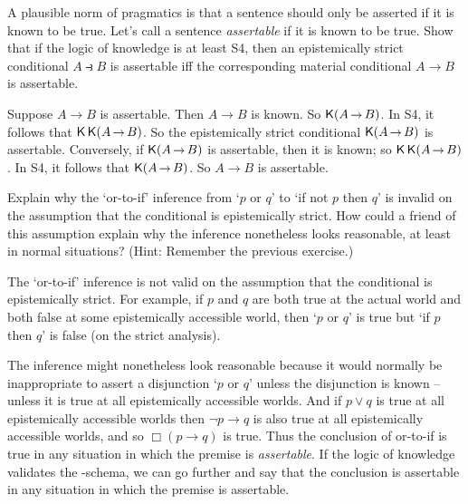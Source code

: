 
\begin{exercise}
  A plausible norm of pragmatics is that a sentence should only be asserted if
  it is known to be true. Let's call a sentence \emph{assertable} if it is known
  to be true. Show that if the logic of knowledge is at least S4, then an
  epistemically strict conditional $A \strictif B$ is assertable iff the
  corresponding material conditional $A \to B$ is assertable.
\end{exercise}
\begin{solution}
  Suppose $A \to B$ is assertable. Then $A\to B$ is known. So $\Kn (A \to
  B)$. In S4, it follows that $\Kn\Kn(A \to B)$. So the epistemically strict
  conditional $\Kn(A \to B)$ is assertable. Conversely, if $\Kn(A \to B)$ is
  assertable, then it is known; so $\Kn\Kn(A \to B)$. In S4, it follows that
  $\Kn(A \to B)$. So $A \to B$ is assertable.
\end{solution}

\begin{exercise}
  Explain why the `or-to-if' inference from `$p$ or $q$' to `if not $p$ then
  $q$' is invalid on the assumption that the conditional is epistemically
  strict. How could a friend of this assumption explain why the inference
  nonetheless looks reasonable, at least in normal situations? (Hint: Remember
  the previous exercise.)
\end{exercise}
\begin{solution}
  The `or-to-if' inference is not valid on the assumption that the conditional
  is epistemically strict. For example, if $p$ and $q$ are both true at the actual world and both false at some epistemically accessible world, then `$p$ or $q$' is true but `if $p$ then $q$' is false (on the strict analysis).

  The inference might nonetheless look reasonable because it would normally be
  inappropriate to assert a disjunction `$p$ or $q$' unless the disjunction is
  known -- unless it is true at all epistemically accessible worlds. And if
  $p \lor q$ is true at all epistemically accessible worlds then $\neg p \to q$
  is also true at all epistemically accessible worlds, and so $\Box(p \to q)$ is
  true. Thus the conclusion of or-to-if is true in any situation in which the
  premise is \emph{assertable}. If the logic of knowledge validates the
  -schema, we can go further and say that the conclusion is assertable in
  any situation in which the premise is assertable.
\end{solution}

